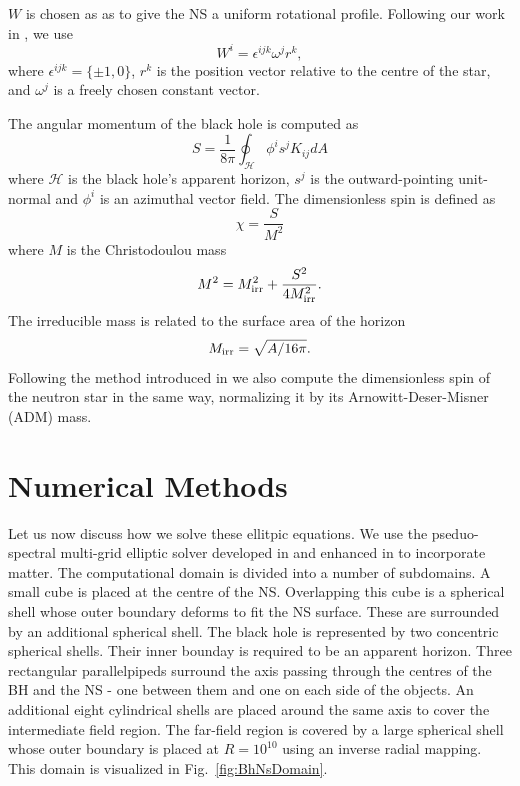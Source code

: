 $W$ is chosen as as to give the NS a uniform rotational
profile. Following our work in \cite{Tacik:2015tja}, we use
\begin{equation}
W^i=\epsilon^{ijk}\omega^jr^k,
\end{equation}
where $\epsilon^{ijk}=\{\pm1,0\}$, $r^k$ is the position vector relative to the centre of the star, and $\omega^j$ is a freely chosen constant vector.

The angular momentum of the black hole is computed as 
\begin{equation}
\label{eq:BhSpin}
S=\frac{1}{8\pi}\oint_{\mathcal{H}}\phi^is^jK_{ij}dA
\end{equation}
where $\mathcal{H}$ is the black hole's apparent horizon, $s^j$ is the
outward-pointing unit-normal and $\phi^i$ is an azimuthal vector
field. The dimensionless spin is defined as
\begin{equation}
\chi=\frac{S}{M^2}
\end{equation}
where $M$ is the Christodoulou mass
\begin{equation}
M^2=M_{\rm irr}^2+\frac{S^2}{4M_{\rm irr}^2}.
\end{equation}
The irreducible mass is related to the surface area of the horizon
\begin{equation}
M_{\rm irr}=\sqrt{A/16\pi}.
\end{equation}
Following the method introduced in \cite{Tacik:2015tja} we also compute the dimensionless spin
of the neutron star in the same way, normalizing it by its
Arnowitt-Deser-Misner (ADM) mass.

\section{Numerical Methods}
\label{sec:NumMethods}
Let us now discuss how we solve these ellitpic equations. We use the
pseduo-spectral multi-grid elliptic solver developed in
\cite{Pfeiffer2003} and enhanced in \cite{FoucartEtAl:2008} to incorporate matter. The computational domain is divided into a number of subdomains. A small cube is placed at the centre of the NS. Overlapping this cube is a spherical shell whose outer boundary deforms to fit the NS surface. These are surrounded by an additional spherical shell. The black hole is represented by two concentric spherical shells. Their inner bounday is required to be an apparent horizon. Three rectangular parallelpipeds surround the axis passing through the centres of the BH and the NS - one between them and one on each side of the objects. An additional eight cylindrical shells are placed around the same axis to cover the intermediate field region. The far-field region is covered by a large spherical shell whose outer boundary is placed at $R=10^{10}$ using an inverse radial mapping. This domain is visualized in Fig.~\ref{fig:BhNsDomain}.

